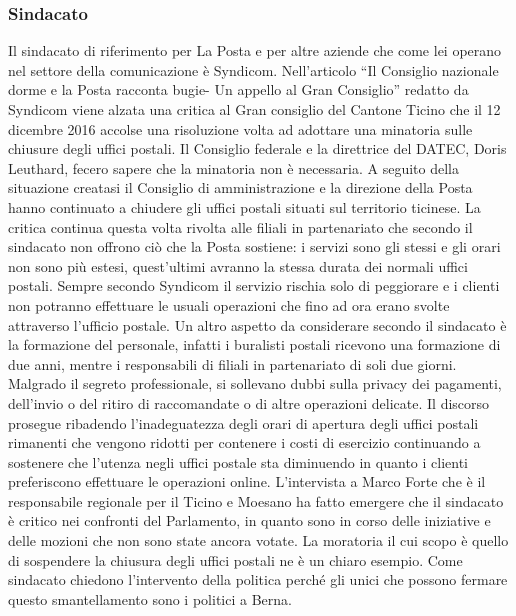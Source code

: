 \subsubsection{Sindacato}
Il sindacato di riferimento per La Posta e per altre aziende che come lei operano nel settore della comunicazione è Syndicom.
Nell’articolo “Il Consiglio nazionale dorme e la Posta racconta bugie- Un appello al Gran Consiglio” redatto da Syndicom viene alzata una critica al Gran consiglio del Cantone Ticino che il 12 dicembre 2016 accolse una risoluzione volta ad adottare una minatoria sulle chiusure degli uffici postali. Il Consiglio federale e la direttrice del DATEC, Doris Leuthard, fecero sapere che la minatoria non è necessaria. A seguito della situazione creatasi il Consiglio di amministrazione e la direzione della Posta hanno continuato a chiudere gli uffici postali situati sul territorio ticinese. La critica continua questa volta rivolta alle filiali in partenariato che secondo il sindacato non offrono ciò che la Posta sostiene: i servizi sono gli stessi e gli orari non sono più estesi, quest’ultimi avranno la stessa durata dei normali uffici postali. Sempre secondo Syndicom il servizio rischia solo di peggiorare e i clienti non potranno effettuare le usuali operazioni che fino ad ora erano svolte attraverso l’ufficio postale. Un altro aspetto da considerare secondo il sindacato è la formazione del personale, infatti i buralisti postali ricevono una formazione di due anni, mentre i responsabili di filiali in partenariato di soli due giorni. Malgrado il segreto professionale, si sollevano dubbi sulla privacy dei pagamenti, dell’invio o del ritiro di raccomandate o di altre operazioni delicate. Il discorso prosegue ribadendo l’inadeguatezza degli orari di apertura degli uffici postali rimanenti che vengono ridotti per contenere i costi di esercizio continuando a sostenere che l’utenza negli uffici postale sta diminuendo in quanto i clienti preferiscono effettuare le operazioni online. 
L’intervista a Marco Forte che è il responsabile regionale per il Ticino e Moesano ha fatto emergere che il sindacato è critico nei confronti del Parlamento, in quanto sono in corso delle iniziative e delle mozioni che non sono state ancora votate. La moratoria il cui scopo è quello di sospendere la chiusura degli uffici postali ne è un chiaro esempio. Come sindacato chiedono l’intervento della politica perché gli unici che possono fermare questo smantellamento sono i politici a Berna.

